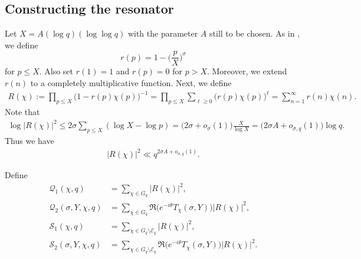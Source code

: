 \documentclass[12pt]{amsart}
\numberwithin{equation}{section}
\theoremstyle{plain}
\theoremstyle{remark}
\theoremstyle{definition}
\theoremstyle{remark}
\begin{document}
\subsection{Constructing the resonator}
Let $X=A(\log q)(\log\log q)$ with the parameter $A$ still to be
chosen. As in \cite{Xiao2022}, we define
\[
r(p)=1-\Big(\frac{p}{X}\Big)^{\sigma}
\]
for $p\leq X$. Also set $r(1)=1$ and $r(p)=0$ for $p>X$. Moreover, we extend $r(n)$ to a completely multiplicative function. Next, we define
\begin{equation*}
\begin{aligned}
R(\chi):=\prod_{p\leq X}\big(1-r(p)\chi(p)\big)^{-1}
=\prod_{p\leq X}\sum_{\ell\geq0}\big(r(p)\chi(p)\big)^{\ell}=\sum_{n=1}^{\infty}r(n)\chi(n).
\end{aligned}
\end{equation*}
Note that
\begin{equation*}
\begin{aligned}
\log|R(\chi)|^2\leq 2\sigma\sum_{p\leq X}(\log X-\log p)
=\big(2\sigma+o_{\sigma}(1)\big)\frac{X}{\log X}
=\big(2\sigma A+o_{\sigma,q}(1)\big)\log q.
\end{aligned}
\end{equation*}
Thus we have
\begin{equation}\label{upper-bound-R-chi-2}
\begin{aligned}
|R(\chi)|^2\ll q^{2\sigma A+o_{\sigma,q}(1)}.
\end{aligned}
\end{equation}


Define
\begin{equation*}
\begin{aligned}
\mathcal{Q}_1(\chi,q)&=\sum_{\chi\in G_q}|R(\chi)|^2,\\
\mathcal{Q}_2(\sigma,Y,\chi,q)&=\sum_{\chi\in G_q}\Re\big(e^{-i\theta}T_{\chi}(\sigma,Y)\big)|R(\chi)|^2,\\
\mathcal{S}_1(\chi,q)&=\sum_{\chi\in G_q\setminus \mathcal{E}_q}|R(\chi)|^2,\\
\mathcal{S}_2(\sigma,Y,\chi,q)&=\sum_{\chi\in G_q\setminus \mathcal{E}_q}\Re\big(e^{-i\theta}T_{\chi}(\sigma,Y)\big)|R(\chi)|^2.
\end{aligned}
\end{equation*}
\end{document}
